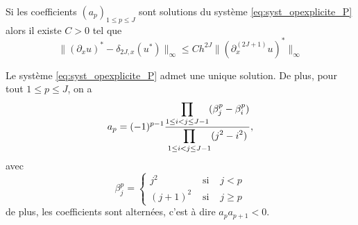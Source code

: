 \begin{corollaire}
Si les coefficients $(a_p)_{1 \leq p \leq J}$ sont solutions du système \eqref{eq:syst_opexplicite_P} alors il existe $C>0$ tel que
\begin{equation}
\| (\partial_x u)^* - \delta_{2J,x}(u^*) \|_{\infty} \leq C h^{2J} \| (\partial^{(2J+1)}_x u)^* \|_{\infty}
\end{equation} 
\end{corollaire}

\begin{proposition}
Le système \eqref{eq:syst_opexplicite_P} admet une unique solution. De plus, pour tout $1 \leq p \leq J$, on a
\begin{equation}
a_p = (-1)^{p-1} \dfrac{\displaystyle\prod\limits_{1 \leq i <j \leq J-1}(\beta_j^p - \beta_i^p)}{\displaystyle\prod\limits_{1 \leq i <j \leq J-1}(j^2 - i^2)},
\end{equation}
avec 
\begin{equation}
\beta^p_j = \left\lbrace
\begin{array}{rcl}
j^2 & \text{ si } & j<p \\
(j+1)^2 & \text{ si } & j \geq p
\end{array}
\right.
\end{equation}
de plus, les coefficients sont alternées, c'est à dire $a_p a_{p+1}<0$.
\end{proposition}

